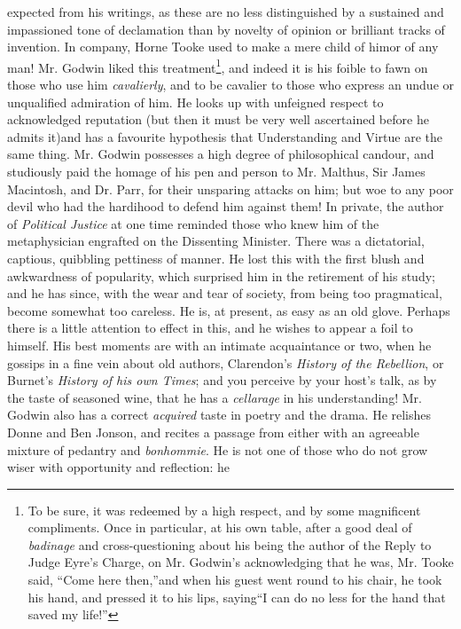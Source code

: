 expected from his writings, as these are no less distinguished by
a sustained and impassioned tone of declamation than by novelty of
opinion or brilliant tracks of invention. In company, Horne Tooke
used to make a mere child of him\textemdash or of any man!
Mr. Godwin liked this treatment\footnote{To be sure, it was
redeemed by a high respect, and by some magnificent
compliments. Once in particular, at his own table, after a good
deal of \emph{badinage} and cross-questioning about his being the
author of the Reply to Judge Eyre's Charge, on Mr. Godwin's
acknowledging that he was, Mr. Tooke said, ``Come here
then,''\textemdash and when his guest went round to his chair, he
took his hand, and pressed it to his lips, saying\textemdash ``I
can do no less for the hand that saved my life!''}, and indeed it
is his foible to fawn on those who use him \emph{cavalierly}, and
to be cavalier to those who express an undue or unqualified
admiration of him. He looks up with unfeigned respect to
acknowledged reputation (but then it must be very well ascertained
before he admits it)\textemdash and has a favourite hypothesis
that Understanding and Virtue are the same thing. Mr. Godwin
possesses a high degree of philosophical candour, and studiously
paid the homage of his pen and person to Mr.  Malthus, Sir James
Macintosh, and Dr. Parr, for their unsparing attacks on him; but
woe to any poor devil who had the hardihood to defend him against
them! In private, the author of \emph{Political Justice} at one
time reminded those who knew him of the metaphysician engrafted on
the Dissenting Minister. There was a dictatorial, captious,
quibbling pettiness of manner. He lost this with the first blush
and awkwardness of popularity, which surprised him in the
retirement of his study; and he has since, with the wear and tear
of society, from being too pragmatical, become somewhat too
careless. He is, at present, as easy as an old glove. Perhaps
there is a little attention to effect in this, and he wishes to
appear a foil to himself. His best moments are with an intimate
acquaintance or two, when he gossips in a fine vein about old
authors, Clarendon's \emph{History of the Rebellion}, or Burnet's
\emph{History of his own Times}; and you perceive by your host's
talk, as by the taste of seasoned wine, that he has a
\emph{cellarage} in his understanding! Mr.  Godwin also has a
correct \emph{acquired} taste in poetry and the drama. He relishes
Donne and Ben Jonson, and recites a passage from either with an
agreeable mixture of pedantry and \emph{bonhommie}. He is not one
of those who do not grow wiser with opportunity and reflection: he
